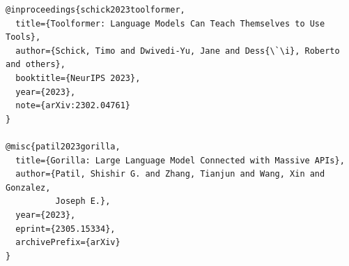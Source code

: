 \documentclass[11pt]{article}
\begin{document}
\begin{lstlisting}[basicstyle=\ttfamily\footnotesize]
@inproceedings{schick2023toolformer,
  title={Toolformer: Language Models Can Teach Themselves to Use Tools},
  author={Schick, Timo and Dwivedi-Yu, Jane and Dess{\`\i}, Roberto and others},
  booktitle={NeurIPS 2023},
  year={2023},
  note={arXiv:2302.04761}
}

@misc{patil2023gorilla,
  title={Gorilla: Large Language Model Connected with Massive APIs},
  author={Patil, Shishir G. and Zhang, Tianjun and Wang, Xin and Gonzalez,
          Joseph E.},
  year={2023},
  eprint={2305.15334},
  archivePrefix={arXiv}
}
\end{lstlisting}
\end{document}
